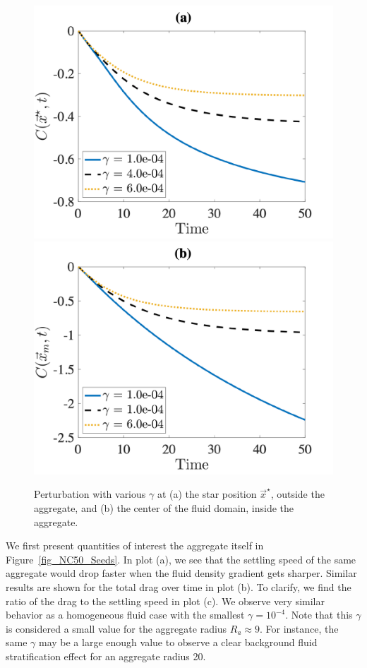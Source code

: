 \begin{figure}[h]
	\begin{center}
		\includegraphics[scale=0.33]{./figures/fig_NC50_g_C_star.pdf}
		\includegraphics[scale=0.33]{./figures/fig_NC50_g_C_M}
	\caption{Perturbation with various $\gamma$ at (a) the star position $\vec{x}^{\star}$, outside the aggregate, and (b) the center of the fluid domain, inside the aggregate.}
	\label{fig_NC50_gCM}
\end{center}
\end{figure}
\par
We first present quantities of interest 
the aggregate itself in Figure~\ref{fig_NC50_Seeds}. In plot (a), we see that the settling speed of the same aggregate would drop faster when the fluid density gradient gets sharper. Similar results are shown for the total drag over time in plot (b). To clarify, we find the ratio of the drag to the settling speed in plot (c). We observe very similar behavior as a homogeneous fluid case with the smallest $\gamma = 10^{-4}$. Note that this $\gamma$ is considered a small value for the aggregate radius $R_a \approx 9$. For instance, the same $\gamma$ may be a large enough value to observe a clear background fluid stratification effect for an aggregate radius 20.
